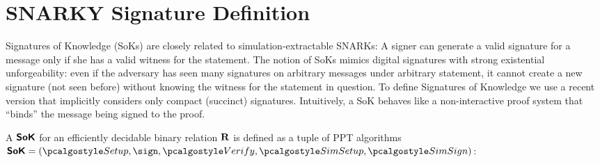 \section{SNARKY Signature Definition}



Signatures of Knowledge (SoKs) \cite{C:ChaLys06} are closely related to
simulation-extractable SNARKs: A signer can generate a valid signature for a message
only if she has a valid witness for the statement.
%
The notion of SoKs mimics digital signatures with strong existential unforgeability:
even if the adversary has seen many signatures on arbitrary messages under arbitrary
statement, it cannot create a new signature (not seen before) without knowing the
witness for the statement in question.
%
To define Signatures of Knowledge we use a recent version \cite{C:GroMal17} that
implicitly considers only compact (succinct) signatures.  Intuitively, a SoK behaves like a non-interactive proof system
that ``binds'' the message being signed to the proof.
     
\label{sec:sok}
A $\bm{\mathsf{SoK}}$ for an efficiently decidable binary relation $\mathbf{R}$ is defined as a tuple of PPT algorithms $\SoK = (\signsetup,  \sign, \allowbreak \verify,  \simsetup, \simsign)$:

